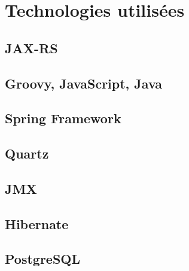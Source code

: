 \documentclass{article}
\begin{document}
\title{}
\author{François-Xavier Guillemette}
\maketitle

\begin{abstract}

\end{abstract}

\pagebreak
\tableofcontents
\pagebreak

\section{Technologies utilisées} %
\label{sec:technologies_utilisees}

\subsection{JAX-RS} %
\label{sub:jax_rs}

\subsection{Groovy, JavaScript, Java} %
\label{sub:groovy}

\subsection{Spring Framework} %
\label{sub:spring_framework}

\subsection{Quartz} %
\label{sub:quartz}

\subsection{JMX} %
\label{sub:jmx}

\subsection{Hibernate} %
\label{sub:hibernate}

\subsection{PostgreSQL} %
\label{sub:postgresql}
\end{document}
